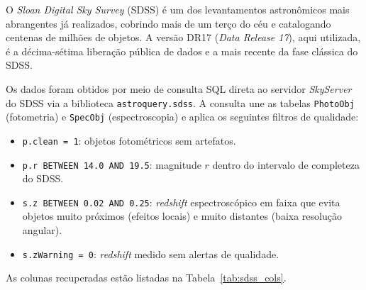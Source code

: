 \documentclass[12pt, a4paper]{article}
\begin{document}
O \textit{Sloan Digital Sky Survey} (SDSS) é um dos levantamentos astronômicos
mais abrangentes já realizados, cobrindo mais de um terço do céu e catalogando
centenas de milhões de objetos. A versão DR17 (\textit{Data Release 17}), aqui
utilizada, é a décima-sétima liberação pública de dados e a mais recente da
fase clássica do SDSS.

Os dados foram obtidos por meio de consulta SQL direta ao servidor
\textit{SkyServer} do SDSS via a biblioteca \texttt{astroquery.sdss}. A consulta
une as tabelas \texttt{PhotoObj} (fotometria) e \texttt{SpecObj} (espectroscopia)
e aplica os seguintes filtros de qualidade:

\begin{itemize}[leftmargin=2em]
  \item \texttt{p.clean = 1}: objetos fotométricos sem artefatos.
  \item \texttt{p.r BETWEEN 14.0 AND 19.5}: magnitude $r$ dentro do intervalo
        de completeza do SDSS.
  \item \texttt{s.z BETWEEN 0.02 AND 0.25}: \textit{redshift} espectroscópico
        em faixa que evita objetos muito próximos (efeitos locais) e muito
        distantes (baixa resolução angular).
  \item \texttt{s.zWarning = 0}: \textit{redshift} medido sem alertas de
        qualidade.
\end{itemize}

As colunas recuperadas estão listadas na Tabela~\ref{tab:sdss_cols}.
\end{document}

